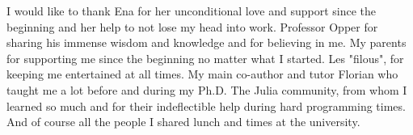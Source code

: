 

\begin{acknowledgements}      %

I would like to thank Ena for her unconditional love and support since the beginning and her help to not lose my head into work.
Professor Opper for sharing his immense wisdom and knowledge and for believing in me. 
My parents for supporting me since the beginning no matter what I started.
Les "filous", for keeping me entertained at all times.  
My main co-author and tutor Florian who taught me a lot before and during my Ph.D.
The Julia community, from whom I learned so much and for their indeflectible help during hard programming times.
And of course all the people I shared lunch and times at the university.


\end{acknowledgements}



